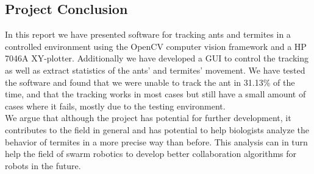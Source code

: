
\subsection{Project Conclusion}

In this report we have presented software for tracking ants and termites in a controlled environment using the OpenCV computer vision framework and a HP 7046A XY-plotter. Additionally we have developed a GUI to control the tracking as well as extract statistics of the ants' and termites' movement. We have tested the software and found that we were unable to track the ant in 31.13\% of the time, and that the tracking works in most cases but still have a small amount of cases where it fails, mostly due to the testing environment. \\

We argue that although the project has potential for further development, it contributes to the field in general and has potential to help biologists analyze the behavior of termites in a more precise way than before. This analysis can in turn help the field of swarm robotics to develop better collaboration algorithms for robots in the future.